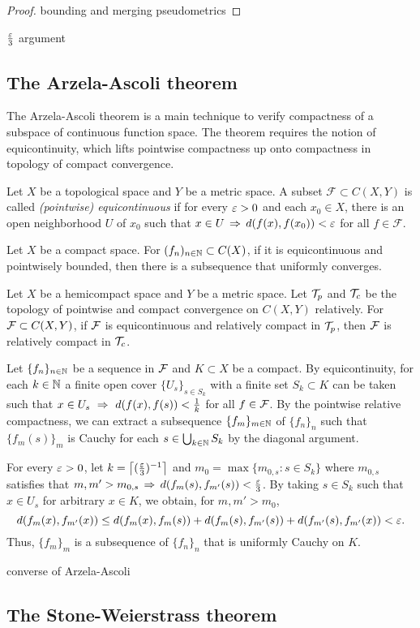 \documentclass{../crs}
\begin{document}
\begin{proof}
bounding and merging pseudometrics
\end{proof}


$\frac{\varepsilon}3$ argument









\subsection{The Arzela-Ascoli theorem}

The Arzela-Ascoli theorem is a main technique to verify compactness of a subspace of continuous function space.
The theorem requires the notion of equicontinuity, which lifts pointwise compactness up onto compactness in topology of compact convergence.

\begin{defn}
Let $X$ be a topological space and $Y$ be a metric space.
A subset $\mathcal{F}\subset C(X,Y)$ is called \emph{(pointwise) equicontinuous} if for every $\varepsilon>0$ and each $x_0\in X$, there is an open neighborhood $U$ of $x_0$ such that $x\in U\,\Rightarrow\,d(f(x),f(x_0))<\varepsilon$ for all $f\in\mathcal{F}$.
\end{defn}


\begin{thm}
Let $X$ be a compact space.
For $(f_n)_{n\in\mathbb{N}}\subset C(X)$, if it is equicontinuous and pointwisely bounded, then there is a subsequence that uniformly converges.
\end{thm}


\begin{thm}
Let $X$ be a hemicompact space and $Y$ be a metric space.
Let $\mathcal{T}_p$ and $\mathcal{T}_c$ be the topology of pointwise and compact convergence on $C(X,Y)$ relatively.
For $\mathcal{F}\subset C(X,Y)$, if $\mathcal{F}$ is equicontinuous and relatively compact in $\mathcal{T}_p$, then $\mathcal{F}$ is relatively compact in $\mathcal{T}_c$.
\end{thm}
\begin{pf}
Let $\{f_n\}_{n\in\mathbb{N}}$ be a sequence in $\mathcal{F}$ and $K\subset X$ be a compact.
By equicontinuity, for each $k\in\mathbb{N}$ a finite open cover $\{U_s\}_{s\in S_k}$ with a finite set $S_k\subset K$ can be taken such that $x\in U_s\,\,\Rightarrow\,\,d(f(x),f(s))<\frac1k$ for all $f\in\mathcal{F}$.
By the pointwise relative compactness, we can extract a subsequence $\{f_m\}_{m\in\mathbb{N}}$ of $\{f_n\}_n$ such that $\{f_m(s)\}_m$ is Cauchy for each $s\in\bigcup_{k\in\mathbb{N}}S_k$ by the diagonal argument.

For every $\varepsilon>0$, let $k=\left\lceil(\frac{\varepsilon}3)^{-1}\right\rceil$ and $m_0=\max\{m_{0,s}:s\in S_k\}$ where $m_{0,s}$ satisfies that $m,m'>m_{0,s}\,\Rightarrow\, d(f_m(s),f_{m'}(s))<\frac{\varepsilon}3$.
By taking $s\in S_k$ such that $x\in U_s$ for arbitrary $x\in K$, we obtain, for $m,m'>m_0$,
\[d(f_m(x),f_{m'}(x))\le d(f_m(x),f_m(s))+d(f_m(s),f_{m'}(s))+d(f_{m'}(s),f_{m'}(x))<\varepsilon.\]
Thus, $\{f_m\}_m$ is a subsequence of $\{f_n\}_n$ that is uniformly Cauchy on $K$.
\end{pf}


converse of Arzela-Ascoli




\subsection{The Stone-Weierstrass theorem} %
\end{document}
